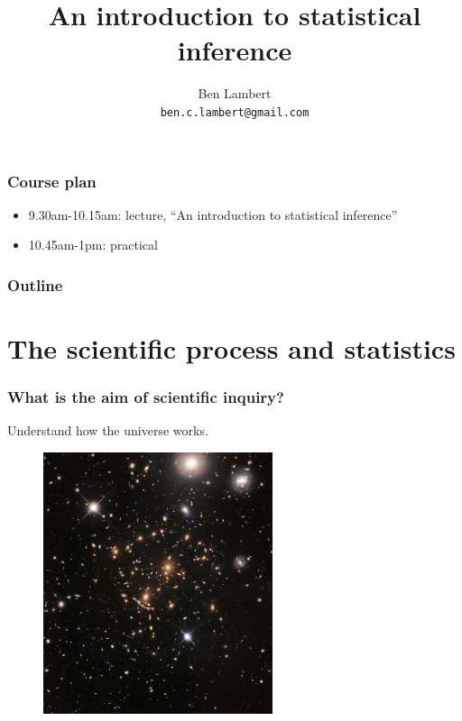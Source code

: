 \documentclass[handout]{beamer}
\title{An introduction to statistical inference}
\author[Ben Lambert]{Ben Lambert\inst{1}\\ \texttt{ben.c.lambert@gmail.com}}
\date{\displaydate{date}}
\institute[University of Oxford]{
\inst{1}University of Oxford}
\begin{document}
\begin{frame}
\titlepage
\end{frame}

\begin{frame}
	\frametitle{Course plan}
	\begin{itemize}
		\item 9.30am-10.15am: lecture, ``An introduction to statistical inference''
		\item 10.45am-1pm: practical
	\end{itemize}
	
\end{frame}

\begin{frame}
	\frametitle{Outline}
	\tableofcontents
\end{frame}

\section{The scientific process and statistics}
\frame{\tableofcontents[currentsection]}

\begin{frame}
	\frametitle{What is the aim of scientific inquiry?}
	Understand how the universe works.
	
		\begin{figure}[ht]
			\centerline{\includegraphics[width=0.6\textwidth]{../figures/universe.jpeg}}
		\end{figure}
	
\end{frame}
\end{document}
